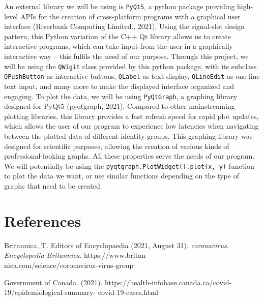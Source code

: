 \documentclass[fontsize=11pt]{article}
\begin{document}
    An external library we will be using is \texttt{PyQt5}, a python package providing high-level APIs for the creation of cross-platform programs with a graphical user interface (Riverbank Computing Limited., 2021). Using the signal-slot design pattern, this Python variation of the C++ Qt library allows us to create interactive programs, which can take input from the user in a graphically interactive way -- this fulfils the need of our purpose. Through this project, we will be using the \texttt{QWigit} class provided by this python package, with its subclass \texttt{QPushButton} as interactive buttons, \texttt{QLabel} as text display, \texttt{QLineEdit} as one-line text input, and many more to make the displayed interface organized and engaging. To plot the data, we will be using \texttt{PyQtGraph}, a graphing library designed for PyQt5 (pyqtgraph, 2021). Compared to other mainstreaming plotting libraries, this library provides a fast refresh speed for rapid plot updates, which allows the user of our program to experience low latencies when navigating between the plotted data of different identity groups. This graphing library was designed for scientific purposes, allowing the creation of various kinds of professional-looking graphs. All these properties serve the needs of our program. We will potentially be using the \texttt{pyqtgraph.PlotWidget().plot(x, y)} function to plot the data we want, or use similar functions depending on the type of graphs that need to be created.

    \section*{References}


    \hangindent=0.7cm
    Britannica, T. Editors of Encyclopaedia (2021, August 31). \textit{coronavirus}. \textit{Encyclopedia Britannica}. https://www.britan\\nica.com/science/coronavirus-virus-group

    \hangindent=0.7cm \noindent
    Government of Canada. (2021). https://health-infobase.canada.ca/covid-19/epidemiological-summary- covid-19-cases.html
\end{document}
